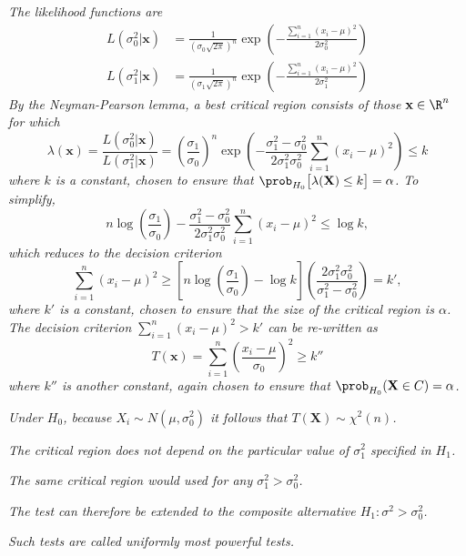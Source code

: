 \begin{solution}
\ben
\it %
The likelihood functions are
\begin{align*}
L(\sigma_0^2|\mathbf{x})	& = \frac{1}{(\sigma_0\sqrt{2\pi})^n} \exp\left(-\frac{\sum_{i=1}^n(x_i-\mu)^2}{2\sigma_0^2}\right) \\
L(\sigma_1^2|\mathbf{x})	& = \frac{1}{(\sigma_1\sqrt{2\pi})^n} \exp\left(-\frac{\sum_{i=1}^n(x_i-\mu)^2}{2\sigma_1^2}\right)
\end{align*}
By the Neyman-Pearson lemma, a best critical region consists of those $\mathbf{x}\in\R^n$ for which
\[
\lambda(\mathbf{x})
	= \frac{L(\sigma_0^2|\mathbf{x})}{L(\sigma_1^2|\mathbf{x})} 
	= \left(\frac{\sigma_1}{\sigma_0}\right)^n \exp\left(-\frac{\sigma_1^2 - \sigma_0^2}{2\sigma_1^2\sigma_0^2}\sum_{i=1}^n(x_i-\mu)^2\right)
	\leq k
\]
where $k$ is a constant, chosen to ensure that $\prob_{H_0}\big[\lambda(\mathbf{X}) \leq k\big]=\alpha$. To simplify,
\[
n\log\left(\frac{\sigma_1}{\sigma_0}\right) - \frac{\sigma_1^2-\sigma_0^2}{2\sigma_1^2\sigma_0^2}\sum_{i=1}^n(x_i-\mu)^2 \leq \log k,
\]
which reduces to the decision criterion
\[
\sum_{i=1}^n(x_i-\mu)^2
	\geq \left[ n\log\left(\frac{\sigma_1}{\sigma_0}\right)-\log k\right]\left(\frac{2\sigma_1^2\sigma_0^2}{\sigma_1^2-\sigma_0^2}\right) = k',
\]
where $k'$ is a constant, chosen to ensure that the size of the critical region is $\alpha$.
\it %
The decision criterion $\sum_{i=1}^n(x_i-\mu)^2 > k'$ can be re-written as
\[
T(\mathbf{x}) = \sum_{i=1}^n\left(\frac{x_i-\mu}{\sigma_0}\right)^2 \geq k''
\]
where $k''$ is another constant, again chosen to ensure that $\prob_{H_0}(\mathbf{X}\in C)=\alpha$. 

\bit
\it Under $H_0$, because $X_i\sim N(\mu,\sigma^2_0)$ it follows that $T(\mathbf{X})\sim \chi^2(n)$.
\eit

\it %
The critical region does not depend on the particular value of $\sigma_1^2$ specified in $H_1$. \par
\bit
\it The same critical region would used for any $\sigma_1^2 > \sigma_0^2$.\par
\it The test can therefore be extended to the composite alternative $H_1:\sigma^2 > \sigma_0^2$.\par
\it Such tests are called \emph{uniformly most powerful} tests.  
\eit
\een
\end{solution}


\stopcontents[chapters]
\endinput
